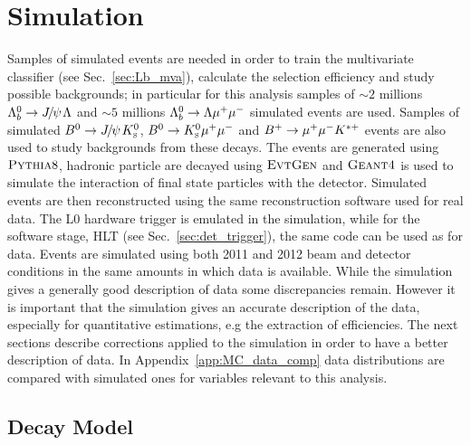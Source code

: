 \section{Simulation}
\label{sec:Lb_simulation}

Samples of simulated events are needed in order to train the multivariate classifier
(see Sec.~\ref{sec:Lb_mva}), calculate the selection efficiency and study possible backgrounds;
in particular for this analysis samples of $\sim 2$ millions $\Lb\to\jpsi\Lz$ and 
$\sim 5$ millions ${{\Lambda}^0_{b}}\rightarrow{\ensuremath{\Lambda}}{\ensuremath{\mu^+\mu^-}}$ simulated events are used.
Samples of simulated $\Bz\ra\jpsi\KS$, ${{B}^0}\rightarrow{\ensuremath{{K}^0_{\rm\scriptscriptstyle S}}}{\ensuremath{\mu^+\mu^-}}$ and $B^{+} \rightarrow{\ensuremath{\mu^+\mu^-}} K^{*+}$
events are also used to study backgrounds from these decays. The events are generated using
$\textsc{Pythia}8$, hadronic particle are decayed using $\textsc{EvtGen}$ and $\textsc{Geant4}$ is used to simulate
the interaction of final state particles with the detector. Simulated events are then
reconstructed using the same reconstruction software used for real data. The L0 hardware
trigger is emulated in the simulation, while for the software stage, HLT
(see Sec.~\ref{sec:det_trigger}), the same code can be used as for data.
Events are simulated using both 2011 and 2012 beam and detector conditions in the same amounts
in which data is available. While the simulation gives a generally good description of data some discrepancies remain.
However it is important that the simulation gives an accurate description of the data, 
especially for quantitative estimations, e.g the extraction of efficiencies. The next sections
describe corrections applied to the simulation in order to have a better description of data.
In Appendix~\ref{app:MC_data_comp} data distributions are compared with simulated ones for
variables relevant to this analysis.

\subsection{Decay Model}
\label{decaymodel}

